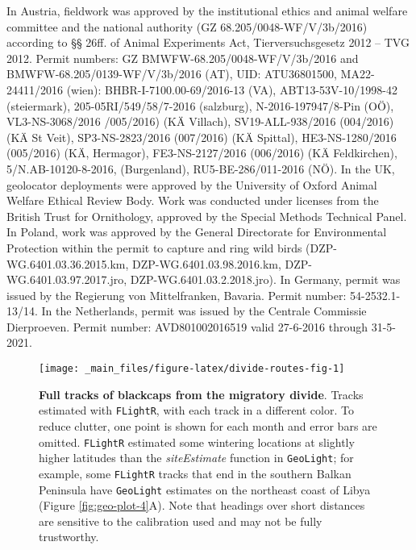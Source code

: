 \documentclass[a4paper, nobind]{templates/ociamthesis}
\begin{document}
In Austria, fieldwork was approved by the institutional ethics and animal welfare committee and the national authority (GZ 68.205/0048-WF/V/3b/2016) according to §§ 26ff. of Animal Experiments Act, Tierversuchsgesetz 2012 -- TVG 2012. Permit numbers: GZ BMWFW-68.205/0048-WF/V/3b/2016 and BMWFW-68.205/0139-WF/V/3b/2016 (AT), UID: ATU36801500, MA22-24411/2016 (wien): BHBR-I-7100.00-69/2016-13 (VA), ABT13-53V-10/1998-42 (steiermark), 205-05RI/549/58/7-2016 (salzburg), N-2016-197947/8-Pin (OÖ), VL3-NS-3068/2016 /005/2016) (KÄ Villach), SV19-ALL-938/2016 (004/2016) (KÄ St Veit), SP3-NS-2823/2016 (007/2016) (KÄ Spittal), HE3-NS-1280/2016 (005/2016) (KÄ, Hermagor), FE3-NS-2127/2016 (006/2016) (KÄ Feldkirchen), 5/N.AB-10120-8-2016, (Burgenland), RU5-BE-286/011-2016 (NÖ). In the UK, geolocator deployments were approved by the University of Oxford Animal Welfare Ethical Review Body. Work was conducted under licenses from the British Trust for Ornithology, approved by the Special Methods Technical Panel. In Poland, work was approved by the General Directorate for Environmental Protection within the permit to capture and ring wild birds (DZP-WG.6401.03.36.2015.km, DZP-WG.6401.03.98.2016.km, DZP-WG.6401.03.97.2017.jro, DZP-WG.6401.03.2.2018.jro). In Germany, permit was issued by the Regierung von Mittelfranken, Bavaria. Permit number: 54-2532.1-13/14. In the Netherlands, permit was issued by the Centrale Commissie Dierproeven. Permit number: AVD801002016519 valid 27-6-2016 through 31-5-2021.



\begin{figure}
\texttt{[image: \_main\_files/figure-latex/divide-routes-fig-1]} \caption{\textbf{Full tracks of blackcaps from the migratory divide}. Tracks estimated with \texttt{FLightR}, with each track in a different color. To reduce clutter, one point is shown for each month and error bars are omitted. \texttt{FLightR} estimated some wintering locations at slightly higher latitudes than the \emph{siteEstimate} function in \texttt{GeoLight}; for example, some \texttt{FLightR} tracks that end in the southern Balkan Peninsula have \texttt{GeoLight} estimates on the northeast coast of Libya (Figure \ref{fig:geo-plot-4}A). Note that headings over short distances are sensitive to the calibration used and may not be fully trustworthy.}\label{fig:divide-routes-fig}
\end{figure}
\end{document}
